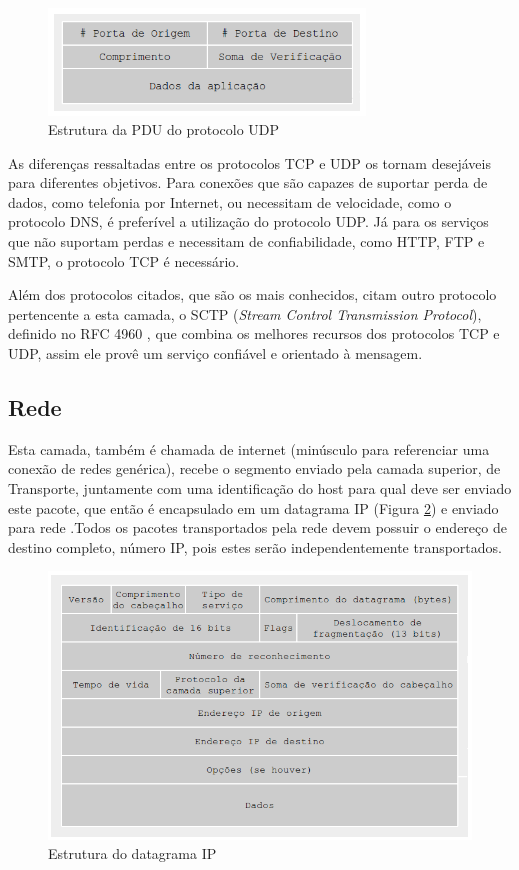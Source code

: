 \begin{figure}
	\centering
    \includegraphics[width=0.75\textwidth]{04-figuras/UDP.png}
    \caption{Estrutura da PDU do protocolo UDP}
    \label{fig:UDP}
\end{figure}

As diferenças ressaltadas entre os protocolos TCP e UDP os tornam desejáveis para diferentes objetivos. Para conexões que são capazes de suportar perda de dados, como telefonia por Internet, ou necessitam de velocidade, como o protocolo DNS, é preferível a utilização do protocolo UDP. Já para os serviços que não suportam perdas e necessitam de confiabilidade, como HTTP, FTP e SMTP, o protocolo TCP é necessário.

Além dos protocolos citados, que são os mais conhecidos,  citam outro protocolo pertencente a esta camada, o SCTP (\textit{Stream Control Transmission Protocol}), definido no RFC 4960 \cite{RFC4960}, que combina os melhores recursos dos protocolos TCP e UDP, assim ele provê um serviço confiável e orientado à mensagem.


\subsection{Rede}

Esta camada, também é chamada de internet (minúsculo para referenciar uma conexão de redes genérica), recebe o segmento enviado pela camada superior, de Transporte, juntamente com uma identificação do host para qual deve ser enviado este pacote, que então é encapsulado em um datagrama IP (Figura \ref{fig:IP}) e enviado para rede \cite{COMER}.Todos os pacotes transportados pela rede devem possuir o endereço de destino completo, número IP, pois estes serão independentemente transportados. 

\begin{figure}[H]
	\centering
    \includegraphics[width=\textwidth]{04-figuras/IPV4.png}
    \caption{Estrutura do datagrama IP}
    \label{fig:IP}
\end{figure}


